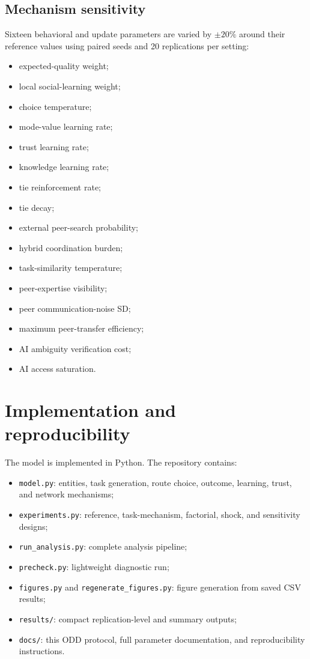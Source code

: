 \documentclass[11pt]{article}
\begin{document}
\subsection{Mechanism sensitivity}
Sixteen behavioral and update parameters are varied by $\pm20\%$ around their reference values using paired seeds and 20 replications per setting:
\begin{itemize}
\item expected-quality weight;
\item local social-learning weight;
\item choice temperature;
\item mode-value learning rate;
\item trust learning rate;
\item knowledge learning rate;
\item tie reinforcement rate;
\item tie decay;
\item external peer-search probability;
\item hybrid coordination burden;
\item task-similarity temperature;
\item peer-expertise visibility;
\item peer communication-noise SD;
\item maximum peer-transfer efficiency;
\item AI ambiguity verification cost;
\item AI access saturation.
\end{itemize}

\section{Implementation and reproducibility}
The model is implemented in Python. The repository contains:
\begin{itemize}
\item \texttt{model.py}: entities, task generation, route choice, outcome, learning, trust, and network mechanisms;
\item \texttt{experiments.py}: reference, task-mechanism, factorial, shock, and sensitivity designs;
\item \texttt{run\_analysis.py}: complete analysis pipeline;
\item \texttt{precheck.py}: lightweight diagnostic run;
\item \texttt{figures.py} and \texttt{regenerate\_figures.py}: figure generation from saved CSV results;
\item \texttt{results/}: compact replication-level and summary outputs;
\item \texttt{docs/}: this ODD protocol, full parameter documentation, and reproducibility instructions.
\end{itemize}
\end{document}
